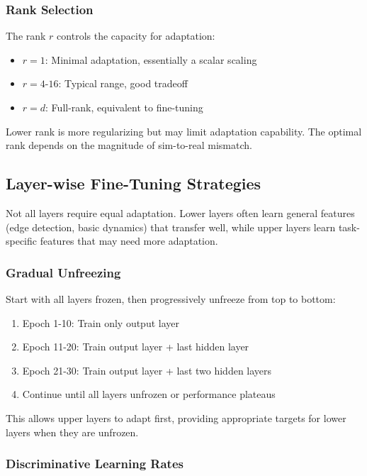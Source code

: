 \subsubsection{Rank Selection}

The rank $r$ controls the capacity for adaptation:
\begin{itemize}
    \item $r = 1$: Minimal adaptation, essentially a scalar scaling
    \item $r = 4$-$16$: Typical range, good tradeoff
    \item $r = d$: Full-rank, equivalent to fine-tuning
\end{itemize}

Lower rank is more regularizing but may limit adaptation capability. The optimal rank depends on the magnitude of sim-to-real mismatch.

\subsection{Layer-wise Fine-Tuning Strategies}

Not all layers require equal adaptation. Lower layers often learn general features (edge detection, basic dynamics) that transfer well, while upper layers learn task-specific features that may need more adaptation.

\subsubsection{Gradual Unfreezing}

Start with all layers frozen, then progressively unfreeze from top to bottom:

\begin{enumerate}
    \item Epoch 1-10: Train only output layer
    \item Epoch 11-20: Train output layer + last hidden layer
    \item Epoch 21-30: Train output layer + last two hidden layers
    \item Continue until all layers unfrozen or performance plateaus
\end{enumerate}

This allows upper layers to adapt first, providing appropriate targets for lower layers when they are unfrozen.

\subsubsection{Discriminative Learning Rates}

